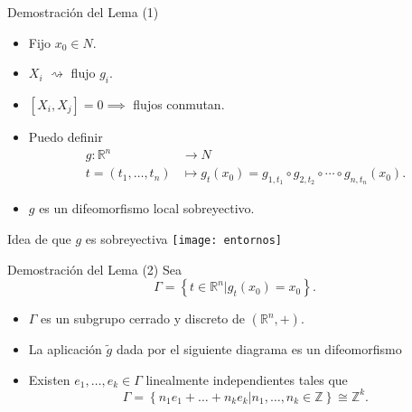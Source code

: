 \documentclass[mathserif]{beamer}
\newcommand{\RR}{\mathbb{R}}
\newcommand{\ZZ}{\mathbb{Z}}
\begin{document}
\begin{frame}{Demostración del Lema (1)}
  \begin{itemize}
    \item Fijo $x_0\in N$.
    \item $X_i$ $\rightsquigarrow$ flujo $g_i$. 
    \item $\left[ X_i,X_j \right]=0 \implies$ flujos conmutan.
    \item Puedo definir
      \begin{align*}
	g :\RR^n &\longrightarrow N\\ 
	t=(t_1,\dots,t_n) &\longmapsto g_t(x_0)= g_{1,t_1}\circ g_{2,t_2}\circ \cdots \circ g_{n,t_n}(x_0).
	\end{align*}
      \item $g$ es un difeomorfismo local sobreyectivo.
  \end{itemize}
\end{frame}

\begin{frame}{Idea de que $g$ es sobreyectiva}
  \texttt{[image: entornos]}
\end{frame}

\begin{frame}{Demostración del Lema (2)}
  Sea 
  \begin{equation*}
    \Gamma=\left\{ t\in \RR^n |g_t(x_0)=x_0 \right\}.
  \end{equation*}
  \begin{itemize}
    \item $\Gamma$ es un subgrupo cerrado y discreto de $(\RR^n,+)$.

\item La aplicación $\tilde{g}$ dada por el siguiente diagrama es un difeomorfismo
  \begin{center}
  \end{center}
\item Existen $e_1,\dots,e_k\in \Gamma$ linealmente independientes tales que
    \begin{equation*}
      \Gamma=\left\{ n_1e_1+\dots+n_ke_k|n_1,\dots,n_k \in \ZZ \right\}\cong \ZZ^k.
    \end{equation*}
  \end{itemize}
\end{frame}
\end{document}
